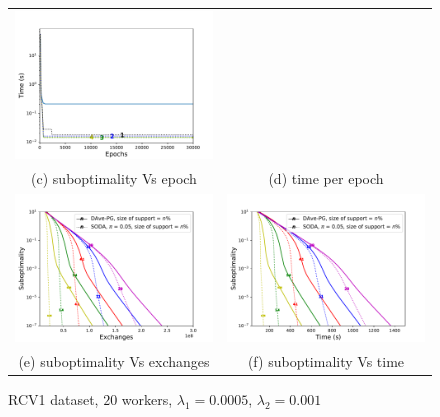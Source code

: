 \begin{figure}
\begin{tabular}{cc}
 \includegraphics[width = 0.49\linewidth]{SODA/Figs/rcv_20w_00005_0001_time_vs_ite.pdf} \\%
(c) suboptimality Vs epoch & (d) time per epoch\\
\includegraphics[width = 0.49\linewidth]{SODA/Figs/rcv1_train_20w_diff_sp_fun_vs_ex_log.pdf} & %
\includegraphics[width = 0.49\linewidth]{SODA/Figs/rcv1_train_20w_diff_sp_fun_vs_time_log.pdf}\\%
(e) suboptimality Vs exchanges & (f) suboptimality Vs time\end{tabular}
    \caption{RCV1 dataset, $20$ workers, $\lambda_1 = 0.0005$, $\lambda_2 = 0.001$}
\end{figure}




